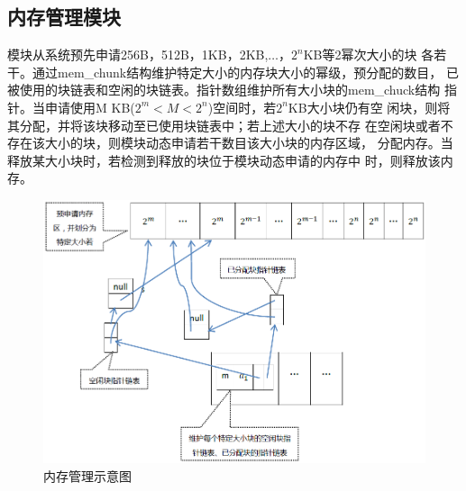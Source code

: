 
%
\subsection{内存管理模块}
		模块从系统预先申请256B，512B，1KB，2KB,$\ldots$，$2^n$KB等2幂次大小的块
		各若干。通过mem\_chunk结构维护特定大小的内存块大小的幂级，预分配的数目，
		已被使用的块链表和空闲的块链表。指针数组维护所有大小块的mem\_chuck结构
		指针。当申请使用M KB($2^m < M < 2^n$)空间时，若$2^n$KB大小块仍有空
		闲块，则将其分配，并将该块移动至已使用块链表中；若上述大小的块不存
		在空闲块或者不存在该大小的块，则模块动态申请若干数目该大小块的内存区域，
		分配内存。当释放某大小块时，若检测到释放的块位于模块动态申请的内存中
		时，则释放该内存。
\begin{figure}[H]
\centering
\includegraphics[keepaspectratio,scale=0.5]{pitures/mm.png}
\caption{内存管理示意图}
\end{figure}


